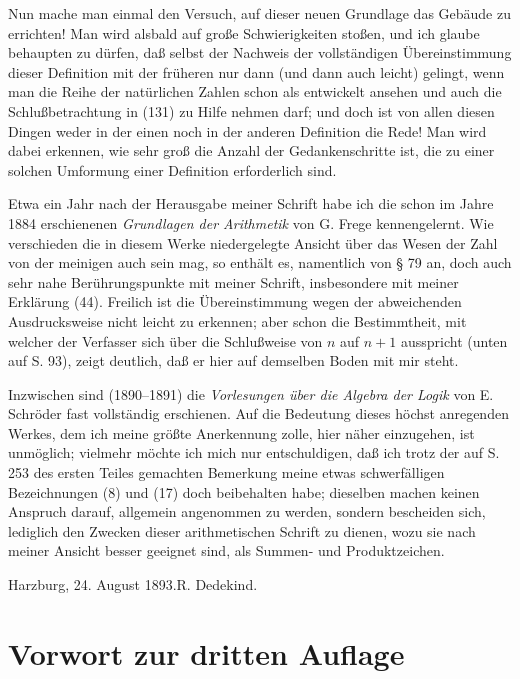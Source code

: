 \documentclass[11pt]{article}
\begin{document}
Nun mache man einmal den Versuch, auf dieser neuen Grundlage das Gebäude zu errichten! Man wird alsbald auf große Schwierigkeiten stoßen, und ich glaube behaupten zu dürfen, daß selbst der Nachweis der vollständigen Übereinstimmung dieser Definition mit der früheren nur dann (und dann auch leicht) gelingt, wenn man die Reihe der natürlichen Zahlen schon als entwickelt ansehen und auch die Schlußbetrachtung in (131) zu Hilfe nehmen darf; und doch ist von allen diesen Dingen weder in der einen noch in der anderen Definition die Rede! Man wird dabei erkennen, wie sehr groß die Anzahl der Gedankenschritte ist, die zu einer solchen Umformung einer Definition erforderlich sind.

Etwa ein Jahr nach der Herausgabe meiner Schrift habe ich die schon im Jahre 1884 erschienenen \emph{Grundlagen der Arithmetik} von G. Frege kennengelernt. Wie verschieden die in diesem Werke niedergelegte Ansicht über das Wesen der Zahl von der meinigen auch sein mag, so enthält es, namentlich von § 79 an, doch auch sehr nahe Berührungspunkte mit meiner Schrift, insbesondere mit meiner Erklärung (44). Freilich ist die Übereinstimmung wegen der abweichenden Ausdrucksweise nicht leicht zu erkennen; aber schon die Bestimmtheit, mit welcher der Verfasser sich über die Schlußweise von $n$ auf $n+1$ ausspricht (unten auf S. 93), zeigt deutlich, daß er hier auf demselben Boden mit mir steht.

Inzwischen sind (1890--1891) die \emph{Vorlesungen über die Algebra der Logik} von E. Schröder fast vollständig erschienen. Auf die Bedeutung dieses höchst anregenden Werkes, dem ich meine größte Anerkennung zolle, hier näher einzugehen, ist unmöglich; vielmehr möchte ich mich nur entschuldigen, daß ich trotz der auf S. 253 des ersten Teiles gemachten Bemerkung meine etwas schwerfälligen Bezeichnungen (8) und (17) doch beibehalten habe; dieselben machen keinen Anspruch darauf, allgemein angenommen zu werden, sondern bescheiden sich, lediglich den Zwecken dieser arithmetischen Schrift zu dienen, wozu sie nach meiner Ansicht besser geeignet sind, als Summen- und Produktzeichen.

\begin{flushright}Harzburg, 24. August 1893.\qquad R. Dedekind.\end{flushright}

\section*{Vorwort zur dritten Auflage}
\end{document}
